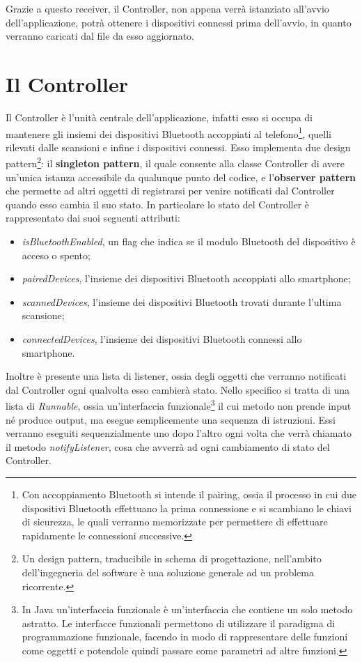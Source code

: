 Grazie a questo receiver, il Controller, non appena verrà istanziato all'avvio dell'applicazione, potrà ottenere i dispositivi connessi prima dell'avvio, in quanto verranno caricati dal file da esso aggiornato.

\section{Il Controller} \label{ref:controller}
Il Controller è l'unità centrale dell'applicazione, infatti esso si occupa di mantenere gli insiemi dei dispositivi Bluetooth accoppiati al telefono\footnote{Con accoppiamento Bluetooth si intende il pairing, ossia il processo in cui due dispositivi Bluetooth effettuano la prima connessione e si scambiano le chiavi di sicurezza, le quali verranno memorizzate per permettere di effettuare rapidamente le connessioni successive.}, quelli rilevati dalle scansioni e infine i dispositivi connessi. Esso implementa due design pattern\footnote{Un design pattern, traducibile in schema di progettazione, nell'ambito dell'ingegneria del software è una soluzione generale ad un problema ricorrente.}: il \textbf{singleton pattern}, il quale consente alla classe Controller di avere un'unica istanza accessibile da qualunque punto del codice, e l'\textbf{observer pattern} che permette ad altri oggetti di registrarsi per venire notificati dal Controller quando esso cambia il suo stato. In particolare lo stato del Controller è rappresentato dai suoi seguenti attributi:
\begin{itemize}
    \item \textit{isBluetoothEnabled}, un flag che indica se il modulo Bluetooth del dispositivo è acceso o spento;
    \item \textit{pairedDevices}, l'insieme dei dispositivi Bluetooth accoppiati allo smartphone;
    \item \textit{scannedDevices}, l'insieme dei dispositivi Bluetooth trovati durante l'ultima scansione;
    \item \textit{connectedDevices}, l'insieme dei dispositivi Bluetooth connessi allo smartphone.
\end{itemize}

Inoltre è presente una lista di listener, ossia degli oggetti che verranno notificati dal Controller ogni qualvolta esso cambierà stato. Nello specifico si tratta di una lista di \textit{Runnable}, ossia un'interfaccia funzionale\footnote{In Java un'interfaccia funzionale è un'interfaccia che contiene un solo metodo astratto. Le interfacce funzionali permettono di utilizzare il paradigma di programmazione funzionale, facendo in modo di rappresentare delle funzioni come oggetti e potendole quindi passare come parametri ad altre funzioni.} il cui metodo non prende input né produce output, ma esegue semplicemente una sequenza di istruzioni. Essi verranno eseguiti sequenzialmente uno dopo l'altro ogni volta che verrà chiamato il metodo \textit{notifyListener}, cosa che avverrà ad ogni cambiamento di stato del Controller.

